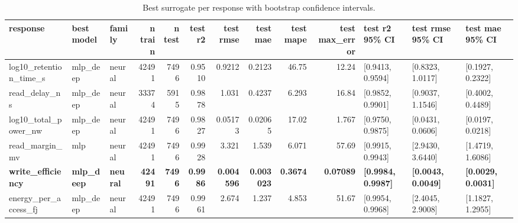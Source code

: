 \begin{table}[!t]
\centering
\caption{Best surrogate per response with bootstrap confidence intervals.}
\label{tab:surrogate_best_main}
\footnotesize
\begin{tabular}{lllrrrrrrrlll}
\toprule
response & best model & family & n train & n test & test r2 & test rmse & test mae & test mape & test max\_error & test r2 95\% CI & test rmse 95\% CI & test mae 95\% CI \\
\midrule
log10\_retention\_time\_s & mlp\_deep & neural & 42491 & 7496 & 0.9510 & 0.9212 & 0.2123 & 46.75 & 12.24 & [0.9413, 0.9594] & [0.8323, 1.0117] & [0.1927, 0.2322] \\
read\_delay\_ns & mlp\_deep & neural & 33374 & 5915 & 0.9878 & 1.031 & 0.4237 & 6.293 & 16.84 & [0.9852, 0.9901] & [0.9037, 1.1546] & [0.4002, 0.4489] \\
log10\_total\_power\_nw & mlp\_deep & neural & 42491 & 7496 & 0.9827 & 0.05173 & 0.02065 & 17.02 & 1.767 & [0.9750, 0.9875] & [0.0431, 0.0606] & [0.0197, 0.0218] \\
read\_margin\_mv & mlp & neural & 42491 & 7496 & 0.9928 & 3.321 & 1.539 & 6.071 & 57.69 & [0.9915, 0.9943] & [2.9430, 3.6440] & [1.4719, 1.6086] \\
\textbf{write\_efficiency} & \textbf{mlp\_deep} & \textbf{neural} & \textbf{42491} & \textbf{7496} & \textbf{0.9986} & \textbf{0.004596} & \textbf{0.003023} & \textbf{0.3674} & \textbf{0.07089} & \textbf{[0.9984, 0.9987]} & \textbf{[0.0043, 0.0049]} & \textbf{[0.0029, 0.0031]} \\
energy\_per\_access\_fj & mlp\_deep & neural & 42491 & 7496 & 0.9961 & 2.674 & 1.237 & 4.853 & 51.67 & [0.9954, 0.9968] & [2.4045, 2.9008] & [1.1827, 1.2955] \\
\bottomrule
\end{tabular}
\end{table}
